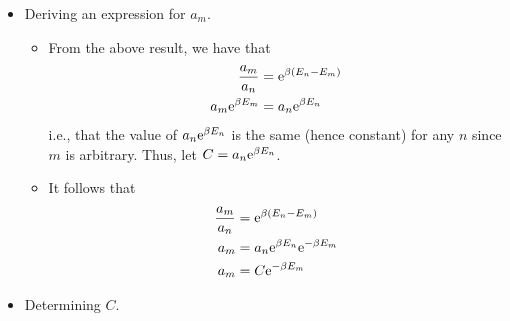 \documentclass[../notes.tex]{subfiles}
\begin{document}
\begin{itemize}
\begin{itemize}
\begin{equation*}
        \end{equation*}
        \item The above equation must hold for any two energy states, so we can also write $a_l/a_m=f(E_m-E_l)$ and $a_l/a_n=f(E_n-E_l)$ for instance. But this implies that
        \begin{align*}
            \frac{a_l}{a_n} &= \frac{a_m}{a_n}\cdot\frac{a_l}{a_m}\\
            f(E_n-E_l) &= f(E_n-E_m)f(E_m-E_l)
        \end{align*}
        \item The above equation uniquely describes an exponential function, so we take $f(E)=\e[\beta E]$\footnote{Note that the base need not be $\e$, but we can take it to be $\e$ WLOG since $\e[\beta E]=(\e[\beta])^E$ and we may take $\beta$ such that $\e[\beta]$ equals any positive real number.}.
        \begin{itemize}
            \item To check that our definition of $f$ satisfies the above equation, note that
            \begin{equation*}
                \e[\beta(E_n-E_l)] = \e[\beta(E_n-E_m)]\e[\beta(E_m-E_l)]
            \end{equation*}
        \end{itemize}
    \end{itemize}
    \item Deriving an expression for $a_m$.
    \begin{itemize}
        \item From the above result, we have that
        \begin{align*}
            \frac{a_m}{a_n} &= \e[\beta(E_n-E_m)]\\
            a_m\e[\beta E_m] &= a_n\e[\beta E_n]
        \end{align*}
        i.e., that the value of $a_n\e[\beta E_n]$ is the same (hence constant) for any $n$ since $m$ is arbitrary. Thus, let $C=a_n\e[\beta E_n]$.
        \item It follows that
        \begin{align*}
            \frac{a_m}{a_n} &= \e[\beta(E_n-E_m)]\\
            a_m &= a_n\e[\beta E_n]\e[-\beta E_m]\\
            a_m &= C\e[-\beta E_m]
        \end{align*}
    \end{itemize}
    \item Determining $C$.

\end{itemize}
\end{document}
